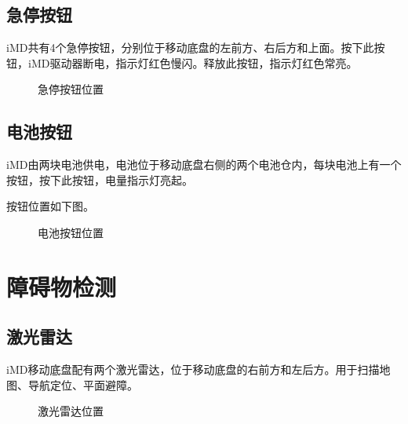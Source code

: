 \documentclass[a4paper,11pt,english,openany,oneside]{sphinxmanual}
\begin{document}
\subsection{急停按钮}
\label{\detokenize{07 _u6280_u672f_u89c4_u683c:id24}}\label{\detokenize{07 _u6280_u672f_u89c4_u683c:id25}}
\sphinxAtStartPar
iM\sphinxhyphen{}D共有4个急停按钮，分别位于移动底盘的左前方、右后方和上面。按下此按钮，iM\sphinxhyphen{}D驱动器断电，指示灯红色慢闪。释放此按钮，指示灯红色常亮。

\begin{figure}[H]
\centering
\capstart

\noindent{}
\caption{急停按钮位置}\label{\detokenize{07 _u6280_u672f_u89c4_u683c:id57}}\end{figure}


\subsection{电池按钮}
\label{\detokenize{07 _u6280_u672f_u89c4_u683c:id26}}\label{\detokenize{07 _u6280_u672f_u89c4_u683c:id27}}
\sphinxAtStartPar
iM\sphinxhyphen{}D由两块电池供电，电池位于移动底盘右侧的两个电池仓内，每块电池上有一个按钮，按下此按钮，电量指示灯亮起。

\sphinxAtStartPar
按钮位置如下图。

\begin{figure}[H]
\centering
\capstart

\noindent{}
\caption{电池按钮位置}\label{\detokenize{07 _u6280_u672f_u89c4_u683c:id58}}\end{figure}


\section{障碍物检测}
\label{\detokenize{07 _u6280_u672f_u89c4_u683c:id28}}\label{\detokenize{07 _u6280_u672f_u89c4_u683c:id29}}

\subsection{激光雷达}
\label{\detokenize{07 _u6280_u672f_u89c4_u683c:id30}}\label{\detokenize{07 _u6280_u672f_u89c4_u683c:id31}}
\sphinxAtStartPar
iM\sphinxhyphen{}D移动底盘配有两个激光雷达，位于移动底盘的右前方和左后方。用于扫描地图、导航定位、平面避障。

\begin{figure}[H]
\centering
\capstart

\noindent{}
\caption{激光雷达位置}\label{\detokenize{07 _u6280_u672f_u89c4_u683c:id59}}\end{figure}
\end{document}
